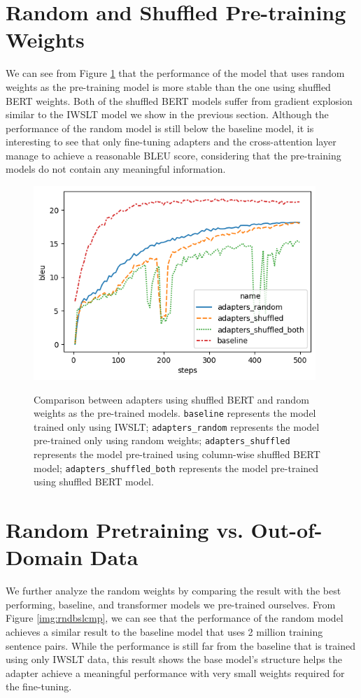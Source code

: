 \section{Random and Shuffled Pre-training Weights}
We can see from Figure \ref{img:shfrndcmp} that the performance of the model that uses random weights as the pre-training model is more stable than the one using shuffled BERT weights. Both of the shuffled BERT models suffer from gradient explosion similar to the IWSLT model we show in the previous section. Although the performance of the random model is still below the baseline model, it is interesting to see that only fine-tuning adapters and the cross-attention layer manage to achieve a reasonable BLEU score, considering that the pre-training models do not contain any meaningful information.
\begin{figure}[h]
    {\includegraphics[width=0.95\textwidth]{img/randomshuffled.png}}
    \centering
    \caption{Comparison between adapters using shuffled BERT and random weights as the pre-trained models. \texttt{baseline} represents the model trained only using IWSLT; \texttt{adapters\_random} represents the model pre-trained only using random weights; \texttt{adapters\_shuffled} represents the model pre-trained using column-wise shuffled BERT model; \texttt{adapters\_shuffled\_both} represents the model pre-trained using shuffled BERT model.}
    \label{img:shfrndcmp}
\end{figure}

\section{Random Pretraining vs. Out-of-Domain Data}
We further analyze the random weights by comparing the result with the best performing, baseline, and transformer models we pre-trained ourselves. From Figure \ref{img:rndbslcmp}, we can see that the performance of the random model achieves a similar result to the baseline model that uses 2 million training sentence pairs. While the performance is still far from the baseline that is trained using only IWSLT data, this result shows the base model's structure helps the adapter achieve a meaningful performance with very small weights required for the fine-tuning.

